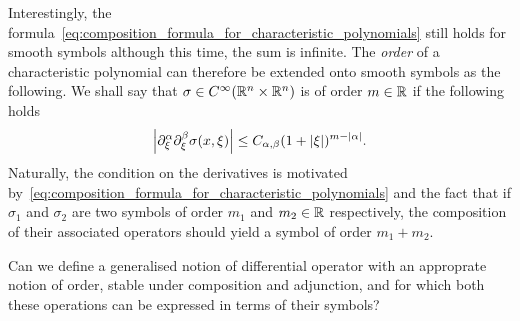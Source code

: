 Interestingly, the formula~\eqref{eq:composition_formula_for_characteristic_polynomials} still holds for smooth symbols
although this time, the sum is infinite.
The \emph{order} of a characteristic polynomial can therefore be extended onto smooth symbols as the following.
We shall say that $\sigma \in {C^\infty(\mathbb{R}^n \times \mathbb{R}^n)}$ is of order $m \in \mathbb{R}$
if the following holds
\begin{align*}
    \abs {\iD{\xi^\alpha, \xi^\beta} \sigma(x, \xi)} \leq C_{\alpha, \beta} (1 + \abs \xi)^{m - \abs \alpha}.
\end{align*}
Naturally, the condition on the derivatives is motivated by~\eqref{eq:composition_formula_for_characteristic_polynomials} and the fact that
if $\sigma_1$ and $\sigma_2$ are two symbols of order $m_1$ and $m_2 \in \mathbb{R}$ respectively,
the composition of their associated operators should yield a symbol of order $m_1 + m_2$.

Can we define a generalised notion of differential operator
with an approprate notion of order,
stable under composition and adjunction,
and for which both these operations can be expressed in terms of their symbols?
